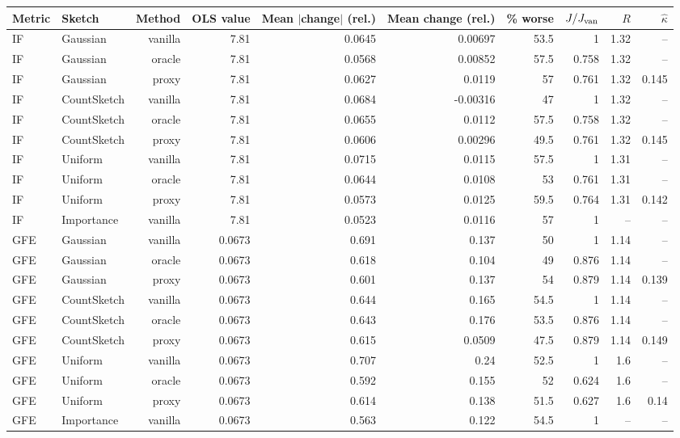 \begin{table}[t]
\centering
\small
\begin{tabular}{llrrrrrrrr}
\toprule
Metric & Sketch & Method & OLS value & Mean $|$change$|$ (rel.) & Mean change (rel.) & \% worse & $J/J_{\rm van}$ & $R$ & $\hat\kappa$ \\
\midrule
IF & Gaussian & vanilla & 7.81 & 0.0645 & 0.00697 & 53.5 & 1 & 1.32 & -- \\
IF & Gaussian & oracle & 7.81 & 0.0568 & 0.00852 & 57.5 & 0.758 & 1.32 & -- \\
IF & Gaussian & proxy & 7.81 & 0.0627 & 0.0119 & 57 & 0.761 & 1.32 & 0.145 \\
IF & CountSketch & vanilla & 7.81 & 0.0684 & -0.00316 & 47 & 1 & 1.32 & -- \\
IF & CountSketch & oracle & 7.81 & 0.0655 & 0.0112 & 57.5 & 0.758 & 1.32 & -- \\
IF & CountSketch & proxy & 7.81 & 0.0606 & 0.00296 & 49.5 & 0.761 & 1.32 & 0.145 \\
IF & Uniform & vanilla & 7.81 & 0.0715 & 0.0115 & 57.5 & 1 & 1.31 & -- \\
IF & Uniform & oracle & 7.81 & 0.0644 & 0.0108 & 53 & 0.761 & 1.31 & -- \\
IF & Uniform & proxy & 7.81 & 0.0573 & 0.0125 & 59.5 & 0.764 & 1.31 & 0.142 \\
IF & Importance & vanilla & 7.81 & 0.0523 & 0.0116 & 57 & 1 & -- & -- \\
\midrule
GFE & Gaussian & vanilla & 0.0673 & 0.691 & 0.137 & 50 & 1 & 1.14 & -- \\
GFE & Gaussian & oracle & 0.0673 & 0.618 & 0.104 & 49 & 0.876 & 1.14 & -- \\
GFE & Gaussian & proxy & 0.0673 & 0.601 & 0.137 & 54 & 0.879 & 1.14 & 0.139 \\
GFE & CountSketch & vanilla & 0.0673 & 0.644 & 0.165 & 54.5 & 1 & 1.14 & -- \\
GFE & CountSketch & oracle & 0.0673 & 0.643 & 0.176 & 53.5 & 0.876 & 1.14 & -- \\
GFE & CountSketch & proxy & 0.0673 & 0.615 & 0.0509 & 47.5 & 0.879 & 1.14 & 0.149 \\
GFE & Uniform & vanilla & 0.0673 & 0.707 & 0.24 & 52.5 & 1 & 1.6 & -- \\
GFE & Uniform & oracle & 0.0673 & 0.592 & 0.155 & 52 & 0.624 & 1.6 & -- \\
GFE & Uniform & proxy & 0.0673 & 0.614 & 0.138 & 51.5 & 0.627 & 1.6 & 0.14 \\
GFE & Importance & vanilla & 0.0673 & 0.563 & 0.122 & 54.5 & 1 & -- & -- \\

\end{tabular}
\end{table}
